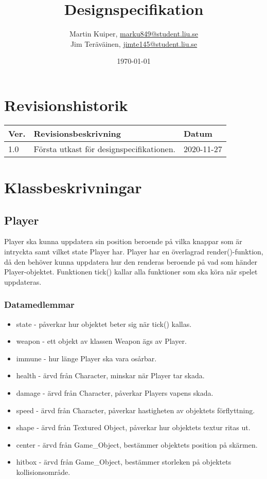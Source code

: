 \documentclass{TDP005mall}
\author{Martin Kuiper, \url{marku849@student.liu.se}\\
  Jim Teräväinen, \url{jimte145@student.liu.se}}
\title{Designspecifikation}
\date{\today}
\begin{document}
\projectpage
\section{Revisionshistorik}
\begin{table}[!h]
\begin{tabularx}{\linewidth}{|l|X|l|}
\hline
Ver. & Revisionsbeskrivning & Datum \\\hline
1.0 & Första utkast för designspecifikationen. & 2020-11-27 \\\hline
\end{tabularx}
\end{table}

\section{Klassbeskrivningar}
\subsection{Player}
Player ska kunna uppdatera sin position beroende på vilka knappar som är intryckta samt vilket state Player har.
Player har en överlagrad render()-funktion, då den behöver kunna uppdatera hur den renderas beroende på vad som händer Player-objektet.
Funktionen tick() kallar alla funktioner som ska köra när spelet uppdateras. 

\subsubsection{Datamedlemmar}
\begin{itemize}
\item state - påverkar hur objektet beter sig när tick() kallas.
\item weapon - ett objekt av klassen Weapon ägs av Player.
\item immune - hur länge Player ska vara osårbar.
\item health - ärvd från Character, minskar när Player tar skada.
\item damage - ärvd från Character, påverkar Players vapens skada.
\item speed - ärvd från Character, påverkar hastigheten av objektets förflyttning.
\item shape - ärvd från Textured Object, påverkar hur objektets textur ritas ut.
\item center - ärvd från Game\_Object, bestämmer objektets position på skärmen.
\item hitbox - ärvd från Game\_Object, bestämmer storleken på objektets kollisionsområde.
\end{itemize}
\end{document}
